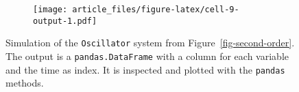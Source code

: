 \begin{figure}[t]
\begin{minipage}[t]{0.45\linewidth}
{\begin{figure}[H]

{\centering \texttt{[image: article\_files/figure-latex/cell-9-output-1.pdf]}

}

\end{figure}

}

\end{minipage}%

\caption{\label{fig-sim}Simulation of the \texttt{Oscillator} system
from Figure~\ref{fig-second-order}. The output is a
\texttt{pandas.DataFrame} with a column for each variable and the time
as index. It is inspected and plotted with the \texttt{pandas} methods.}

\end{figure}
